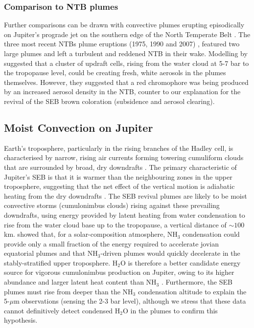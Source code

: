 \documentclass[final,authoryear,5p,times,twocolumn]{elsarticle}
\begin{document}
\subsubsection{Comparison to NTB plumes}
Further comparisons can be drawn with convective plumes erupting episodically on Jupiter's prograde jet on the southern edge of the North Temperate Belt \citep[the NTBs jet at $23.5^\circ$N, see Chapter 7 of][]{95rogers}.  The three most recent NTBs plume eruptions (1975, 1990 and 2007) \citep{91sanchez, 08sanchez}, featured two large plumes and left a turbulent and reddened NTB in their wake.  Modelling by \citet{08sanchez} suggested that a cluster of updraft cells, rising from the water cloud at 5-7 bar to the tropopause level, could be creating fresh, white aerosols in the plumes themselves.  However, they suggested that a red chromophore was being produced by an increased aerosol density in the NTB, counter to our explanation for the revival of the SEB brown coloration (subsidence and aerosol clearing).  

\subsection{Moist Convection on Jupiter}
Earth's troposphere, particularly in the rising branches of the Hadley cell, is characterised by narrow, rising air currents forming towering cumuliform clouds that are surrounded by broad, dry downdrafts \citep{00ingersoll}.  The primary characteristic of Jupiter's SEB is that it is warmer than the neighbouring zones in the upper troposphere, suggesting that the net effect of the vertical motion is adiabatic heating from the dry downdrafts \citep[e.g.,][]{86gierasch}.  The SEB revival plumes are likely to be moist convective storms (cumulonimbus clouds) rising against these prevailing downdrafts, using energy provided by latent heating from water condensation \citep[e.g.,][]{70barcilon,72kuiper,86stoker} to rise from the water cloud base \citep[4-6 bar, depending on Jupiter's bulk oxygen content,][]{14sugiyama} up to the tropopause, a vertical distance of $\sim100$ km.  \citet{86stoker} showed that, for a solar-composition atmosphere, NH$_3$ condensation could provide only a small fraction of the energy required to accelerate jovian equatorial plumes and that NH$_3$-driven plumes would quickly decelerate in the stably-stratified upper troposphere.  H$_2$O is therefore a better candidate energy source for vigorous cumulonimbus production on Jupiter, owing to its higher abundance and larger latent heat content than NH$_3$ \citep[see also][]{14sugiyama}.  Furthermore, the SEB plumes must rise from deeper than the NH$_3$ condensation altitude to explain the 5-$\mu$m observations (sensing the 2-3 bar level), although we stress that these data cannot definitively detect condensed H$_2$O in the plumes to confirm this hypothesis.  
\end{document}
